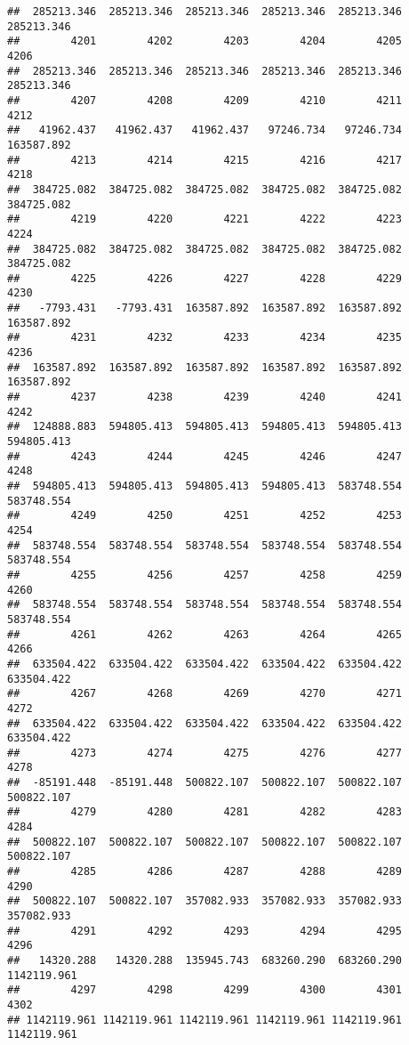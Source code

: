 \documentclass[
]{book}
\begin{document}
\begin{verbatim}
##  285213.346  285213.346  285213.346  285213.346  285213.346  285213.346 
##        4201        4202        4203        4204        4205        4206 
##  285213.346  285213.346  285213.346  285213.346  285213.346  285213.346 
##        4207        4208        4209        4210        4211        4212 
##   41962.437   41962.437   41962.437   97246.734   97246.734  163587.892 
##        4213        4214        4215        4216        4217        4218 
##  384725.082  384725.082  384725.082  384725.082  384725.082  384725.082 
##        4219        4220        4221        4222        4223        4224 
##  384725.082  384725.082  384725.082  384725.082  384725.082  384725.082 
##        4225        4226        4227        4228        4229        4230 
##   -7793.431   -7793.431  163587.892  163587.892  163587.892  163587.892 
##        4231        4232        4233        4234        4235        4236 
##  163587.892  163587.892  163587.892  163587.892  163587.892  163587.892 
##        4237        4238        4239        4240        4241        4242 
##  124888.883  594805.413  594805.413  594805.413  594805.413  594805.413 
##        4243        4244        4245        4246        4247        4248 
##  594805.413  594805.413  594805.413  594805.413  583748.554  583748.554 
##        4249        4250        4251        4252        4253        4254 
##  583748.554  583748.554  583748.554  583748.554  583748.554  583748.554 
##        4255        4256        4257        4258        4259        4260 
##  583748.554  583748.554  583748.554  583748.554  583748.554  583748.554 
##        4261        4262        4263        4264        4265        4266 
##  633504.422  633504.422  633504.422  633504.422  633504.422  633504.422 
##        4267        4268        4269        4270        4271        4272 
##  633504.422  633504.422  633504.422  633504.422  633504.422  633504.422 
##        4273        4274        4275        4276        4277        4278 
##  -85191.448  -85191.448  500822.107  500822.107  500822.107  500822.107 
##        4279        4280        4281        4282        4283        4284 
##  500822.107  500822.107  500822.107  500822.107  500822.107  500822.107 
##        4285        4286        4287        4288        4289        4290 
##  500822.107  500822.107  357082.933  357082.933  357082.933  357082.933 
##        4291        4292        4293        4294        4295        4296 
##   14320.288   14320.288  135945.743  683260.290  683260.290 1142119.961 
##        4297        4298        4299        4300        4301        4302 
## 1142119.961 1142119.961 1142119.961 1142119.961 1142119.961 1142119.961 

\end{verbatim}
\end{document}
